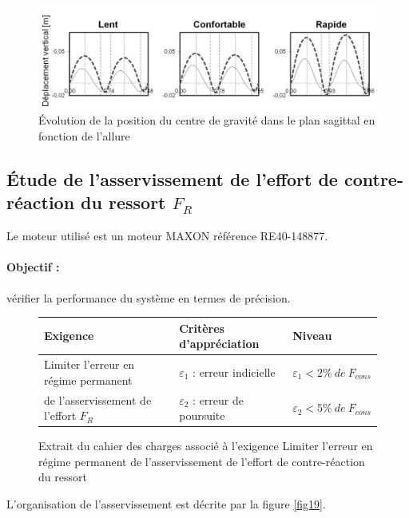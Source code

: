 \begin{figure}[ht!]
\begin{center}
 \includegraphics[width=0.7\linewidth]{img/fig17}
\end{center}
\caption{\label{fig17} Évolution de la position du centre de gravité dans le plan sagittal en fonction de l'allure}
\end{figure}


\subsection{Étude de l'asservissement de l'effort de contre-réaction du ressort $F_R$}

Le moteur utilisé est un moteur MAXON référence RE40-148877.

\paragraph{Objectif :} vérifier la performance du système en termes de précision.

\begin{figure}[ht!]
\begin{tabular}{|m{}|m{}|m{}|}\hline
Exigence & Critères d'appréciation & Niveau \\
\hline
Limiter l'erreur en régime permanent & $\varepsilon_1$ : erreur indicielle
& $\varepsilon_1<2\%\ de\ F_{cons}$ \\
de l'asservissement de l'effort $F_R$ & $\varepsilon_2$ : erreur de poursuite
& $\varepsilon_2<5\%\ de\ F_{cons}$ \\
\hline
\end{tabular}
\caption{\label{fig18} Extrait du cahier des charges associé à l'exigence \og Limiter l'erreur en régime permanent de l'asservissement de l'effort de contre-réaction du ressort \fg}
\end{figure}

L'organisation de l'asservissement est décrite par la figure \ref{fig19}.

